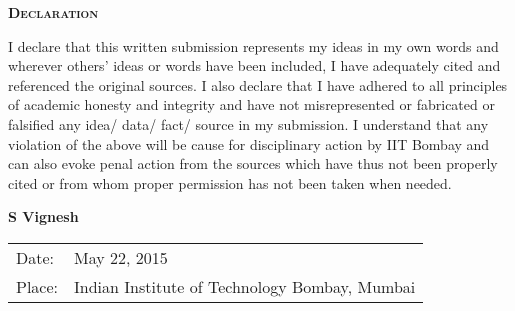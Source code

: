 \newpage
\thispagestyle{empty}
\begin{center}
  \begin{Huge}
    \textsc{\textbf{Declaration}}
  \end{Huge}
\end{center}

\vspace{0.5in}

 I declare that this written submission represents my ideas in my own words and wherever others' ideas or words have been included, I have adequately cited and referenced the original sources. I also declare that I have adhered to all principles of academic honesty and integrity and have not misrepresented or fabricated or falsified any idea/ data/ fact/ source in my submission. I understand that any violation of the above will be cause for disciplinary action by IIT Bombay and can also evoke penal action from the sources which have thus not been properly cited or from whom proper permission has not been taken when needed.

\vspace{1.5in}
\hfill \textbf{S Vignesh}\\
\noindent
\begin{tabular}{ll}
Date: & May 22, 2015\\ \vspace{30pt}
Place: & Indian Institute of Technology Bombay, Mumbai\\
\end{tabular}
% 
% 
% 

  \newpage
  \thispagestyle{empty}    %

